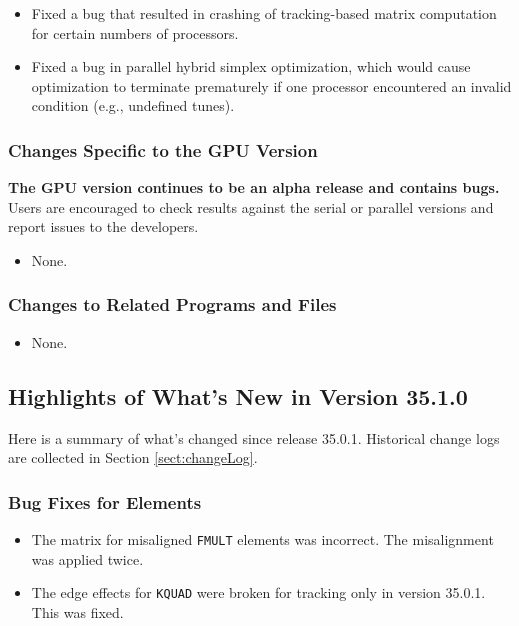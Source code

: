 \documentclass[11pt]{article}
\begin{document}
\begin{itemize}
\item Fixed a bug that resulted in crashing of tracking-based matrix computation for certain numbers of processors.
\item Fixed a bug in parallel hybrid simplex optimization, which would cause optimization to terminate prematurely if
  one processor encountered an invalid condition (e.g., undefined tunes).
\end{itemize}

\subsubsection{Changes Specific to the GPU Version}

{\bf The GPU version continues to be an alpha release and contains bugs.}
Users are encouraged to check results against the serial or parallel versions and report issues to the developers.

\begin{itemize}
\item None.
\end{itemize}

\subsubsection{Changes to Related Programs and Files}

\begin{itemize}
\item None.
\end{itemize}

\subsection{Highlights of What's New in Version 35.1.0}

Here is a summary of what's changed since release 35.0.1.
Historical change logs are collected in Section \ref{sect:changeLog}.

\subsubsection{Bug Fixes for Elements}

\begin{itemize}
\item The matrix for misaligned \verb|FMULT| elements was incorrect. The misalignment was applied twice.
\item The edge effects for \verb|KQUAD| were broken for tracking only in version 35.0.1. This was fixed.
\end{itemize}
\end{document}
